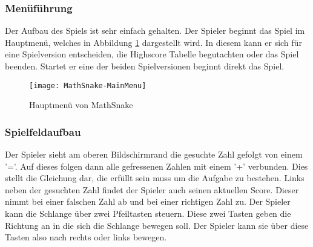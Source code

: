 \subsubsection{Menüführung}
Der Aufbau des Spiels ist sehr einfach gehalten. Der Spieler beginnt das Spiel im Hauptmenü, welches in Abbildung \ref{fig:mathsnake-menu} dargestellt wird. In diesem kann er sich für eine Spielversion entscheiden, die Highscore Tabelle begutachten oder das Spiel beenden. Startet er eine der beiden Spielversionen beginnt direkt das Spiel. 
\begin{figure}[htb]
	\centering
	\texttt{[image: MathSnake-MainMenu]}
	\caption{Hauptmenü von MathSnake\label{fig:mathsnake-menu}}
\end{figure}
\subsubsection{Spielfeldaufbau}
Der Spieler sieht am oberen Bildschirmrand die gesuchte Zahl gefolgt von einem '='. Auf dieses folgen dann alle gefressenen Zahlen mit einem '+' verbunden. Dies stellt die Gleichung dar, die erfüllt sein muss um die Aufgabe zu bestehen. Links neben der gesuchten Zahl findet der Spieler auch seinen aktuellen Score. Dieser nimmt bei einer falschen Zahl ab und bei einer richtigen Zahl zu. Der Spieler kann die Schlange über zwei Pfeiltasten steuern. Diese zwei Tasten geben die Richtung an in die sich die Schlange bewegen soll. Der Spieler kann sie über diese Tasten also nach rechts oder links bewegen. 
